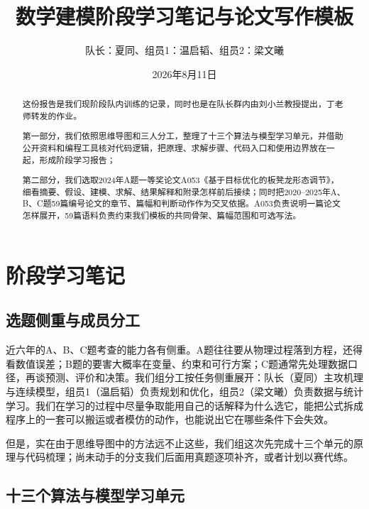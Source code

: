 \documentclass[UTF8,zihao=-4]{ctexart}
\title{\bfseries 数学建模阶段学习笔记与论文写作模板}
\author{队长：夏同、组员1：温启韬、组员2：梁文曦}
\date{2026年8月11日}
\begin{document}
\maketitle

\begin{abstract}
这份报告是我们现阶段队内训练的记录，同时也是在队长群内由刘小兰教授提出，丁老师转发的作业。

第一部分，我们依照思维导图和三人分工，整理了十三个算法与模型学习单元，并借助公开资料和编程工具核对代码逻辑，把原理、求解步骤、代码入口和使用边界放在一起，形成阶段学习报告；

第二部分，我们选取2024年A题一等奖论文A053《基于目标优化的板凳龙形态调节》，细看摘要、假设、建模、求解、结果解释和附录怎样前后接续；同时把2020--2025年A、B、C题59篇编号论文的章节、篇幅和判断动作作为交叉依据。A053负责说明一篇论文怎样展开，59篇语料负责约束我们模板的共同骨架、篇幅范围和可选写法。

\end{abstract}

\tableofcontents
\newpage

\section{阶段学习笔记}

\subsection{选题侧重与成员分工}

近六年的A、B、C题考查的能力各有侧重。A题往往要从物理过程落到方程，还得看数值误差；B题的要害大概率在变量、约束和可行方案；C题通常先处理数据口径，再谈预测、评价和决策。我们组分工按任务侧重展开：队长（夏同）主攻机理与连续模型，组员1（温启韬）负责规划和优化，组员2（梁文曦）负责数据与统计学习。我们在学习的过程中尽量争取能用自己的话解释为什么选它，能把公式拆成程序上的一套可以搬运或者模仿的动作，也能说出它在哪些条件下会失效。

但是，实在由于思维导图中的方法远不止这些，我们组这次先完成十三个单元的原理与代码梳理；尚未动手的分支我们后面用真题逐项补齐，或者计划以赛代练。

\subsection{十三个算法与模型学习单元}
\end{document}
